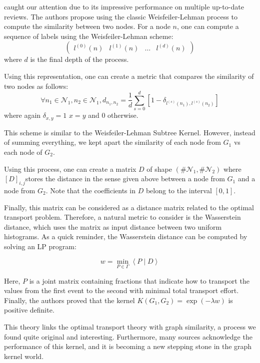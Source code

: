 \documentclass{IEEEtran}
\begin{document}
caught our attention due to its impressive performance on multiple up-to-date reviews. The authors propose using the classic Weisfeiler-Lehman process to compute the similarity between two nodes. For a node $n$, one can compute a sequence of labels using the Weisfeiler-Lehman scheme:
$$\begin{pmatrix} l^{(0)}(n) & l^{(1)}(n) & \dots & l^{(d)}(n)\end{pmatrix} $$
where $d$ is the final depth of the process.

Using this representation, one can create a metric that compares the similarity of two nodes as follows:
\begin{equation*}
    \forall n_1 \in \mathcal{N}_1, n_2 \in \mathcal{N}_1,
    d_{n_1, n_2} = \frac{1}{d} \sum_{s = 0}^d [1 - \delta_{l^{(s)}(n_1), l^{(s)}(n_2)}]
\end{equation*}
where again $\delta_{x, y} = 1$  $x=y$ and $0$ otherwise.

This scheme is similar to the Weisfeiler-Lehman Subtree Kernel. However, instead of summing everything, we kept apart the similarity of each node from $G_1$ vs each node of $G_2$.

Using this process, one can create a matrix $D$ of shape
$(\# \mathcal{N}_1, \# \mathcal{N}_2)$
where $[D]_{i,j}$stores the distance in the sense given above between a node from $G_1$ and a node from $G_2$. Note that the coefficients in $D$ belong to the interval $[0,1]$.

Finally, this matrix can be considered as a distance matrix related to the optimal transport problem. Therefore, a natural metric to consider is the Wasserstein distance, which uses the matrix as input distance between two uniform histograms. As a quick reminder, the Wasserstein distance can be computed by solving an LP program:

\begin{equation*}
    w = \underset{P \in \Gamma}{\operatorname*{min}} \left< P \; | \; D \right>
\end{equation*}

Here, $P$ is a joint matrix containing fractions that indicate how to transport the values from the first event to the second with minimal total transport effort. Finally, the authors proved that the kernel $K(G_1,G_2) = \exp(-\lambda w)$ is positive definite.

This theory links the optimal transport theory with graph similarity, a process we found quite original and interesting. Furthermore, many sources acknowledge the performance of this kernel, and it is becoming a new stepping stone in the graph kernel world.
\end{document}
